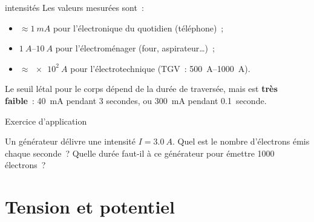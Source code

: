 \documentclass[../main/main.tex]{subfiles}
\begin{document}
\begin{tcbraster}[raster columns=2, raster equal height=rows]
    \begin{odgr}[label=odgr:intensité]{intensités}
        Les valeurs mesurées sont~:

        \begin{itemize}
            \item $\approx \SI{1}{mA}$ pour l'électronique du quotidien
                (téléphone)~;
            \item $\SIrange{1}{10}{A}$ pour l'électroménager (four,
                aspirateur…)~;
            \item $\approx \SI{e2}{A}$ pour l'électrotechnique (TGV~:
                \SIrange{500}{1000}{A}).
        \end{itemize}

        Le seuil létal pour le corps dépend de la durée de traversée, mais est
        \textbf{très faible}~: \SI{40}{mA} pendant 3 secondes, ou \SI{300}{mA}
        pendant \SI{0.1}{seconde}.

    \end{odgr}
    \begin{NCcexe}[width=\linewidth]{Exercice d'application}

        Un générateur délivre une intensité $I = \SI{3.0}{A}$. Quel est le
        nombre d'électrons émis chaque seconde~? Quelle durée faut-il à ce
        générateur pour émettre \num{1000} électrons~?

        \tcblower
        \vspace*{3cm}
    \end{NCcexe}
\end{tcbraster}

\section{Tension et potentiel}
\end{document}
